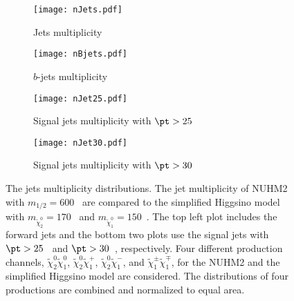 \begin{figure}[htbp]
    \begin{center}
        \begin{subfigure}[b]{0.48\textwidth}
            \texttt{[image: nJets.pdf]}
            \caption{Jets multiplicity}
        \end{subfigure}
        \begin{subfigure}[b]{0.48\textwidth}
            \texttt{[image: nBjets.pdf]}
            \caption{$b$-jets multiplicity}
        \end{subfigure}
        \begin{subfigure}[b]{0.48\textwidth}
            \texttt{[image: nJet25.pdf]}
            \caption{Signal jets multiplicity with $\pt > 25$~{\GeV}}
        \end{subfigure}
        \begin{subfigure}[b]{0.48\textwidth}
            \texttt{[image: nJet30.pdf]}
            \caption{Signal jets multiplicity with $\pt > 30$~{\GeV}}
        \end{subfigure}
    \end{center}
    \caption{The jets multiplicity distributions.
    The jet multiplicity of NUHM2 with $m_{1/2} = 600$~{\GeV} are compared to the simplified Higgsino model with $m_{\widetilde{\chi}^{0}_{2}}=170$~{\GeV} and $m_{\widetilde{\chi}^{0}_{1}}=150$~{\GeV}.
    The top left plot includes the forward jets and the bottom two plots use the signal jets with $\pt > 25$~{\GeV} and $\pt > 30$~{\GeV}, respectively.
    Four different production channels, $\widetilde{\chi}^{0}_{2}\widetilde{\chi}^{0}_{1}$, $\widetilde{\chi}^{0}_{2}\widetilde{\chi}^{+}_{1}$, $\widetilde{\chi}^{0}_{2}\widetilde{\chi}^{-}_{1}$, and $\widetilde{\chi}^{\pm}_{1}\widetilde{\chi}^{\mp}_{1}$, for the NUHM2 and the simplified Higgsino model are considered.
    The distributions of four productions are combined and normalized to equal area.}
    \label{fig:results_nuhm2_jets_multiplicity}
\end{figure}

